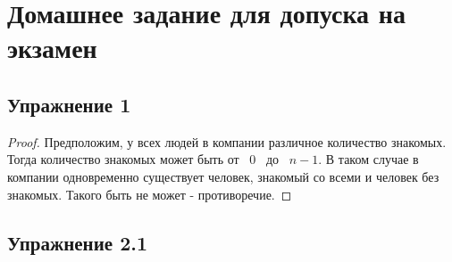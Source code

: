 \documentclass[a4paper]{article}
\begin{document}
\section*{Домашнее задание для допуска на экзамен}

\subsection*{Упражнение 1}
\begin{proof}
Предположим, у всех людей в компании различное количество знакомых. Тогда количество знакомых может быть от \ $0$ \  до \ $n - 1$. В таком случае в компании одновременно существует человек, знакомый со всеми и человек без знакомых. Такого быть не может - противоречие.\end{proof}

\subsection*{Упражнение 2.1}
\end{document}
